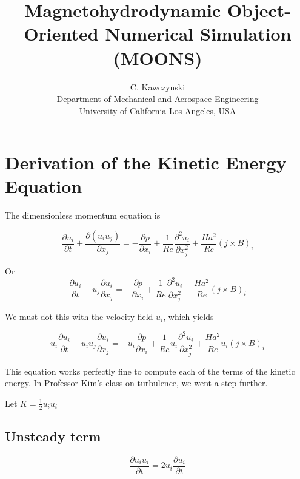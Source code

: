 \documentclass[11pt]{article}
\begin{document}
\doublespacing
\title{Magnetohydrodynamic Object-Oriented Numerical Simulation (MOONS)}
\author{C. Kawczynski \\
Department of Mechanical and Aerospace Engineering \\
University of California Los Angeles, USA\\
}
\maketitle

\section{Derivation of the Kinetic Energy Equation}
The dimensionless momentum equation is

\begin{equation}
	\frac{\partial u_i}{\partial t} + 
	\frac{\partial (u_i u_j)}{\partial x_j}
	= 
	- \frac{\partial p}{\partial x_i}
	+ \frac{1}{Re}
	\frac{\partial^2 u_i}{\partial x_j^2}
	+ \frac{Ha^2}{Re}
	(j \times B)_i
\end{equation}

Or
\begin{equation}
	\frac{\partial u_i}{\partial t} + 
	u_j\frac{\partial u_i}{\partial x_j}
	= 
	- \frac{\partial p}{\partial x_i}
	+ \frac{1}{Re}
	\frac{\partial^2 u_i}{\partial x_j^2}
	+ \frac{Ha^2}{Re}
	(j \times B)_i
\end{equation}


We must dot this with the velocity field $u_i$, which yields

\begin{equation}
	\boxed{
	u_i
	\frac{\partial u_i}{\partial t} + 
	u_i
	u_j\frac{\partial u_i}{\partial x_j}
	= 
	- u_i
	\frac{\partial p}{\partial x_i}
	+ \frac{1}{Re}
	u_i
	\frac{\partial^2 u_i}{\partial x_j^2}
	+ \frac{Ha^2}{Re}
	u_i
	(j \times B)_i
	}
\end{equation}

This equation works perfectly fine to compute each of the terms of the kinetic energy. In Professor Kim's class on turbulence, we went a step further.

Let $K = \frac{1}{2} u_i u_i$

\subsection{Unsteady term}
\begin{equation}
	\frac{\partial u_i u_i}{\partial t}
	=
	2 u_i \frac{\partial u_i}{\partial t}
\end{equation}
\end{document}
